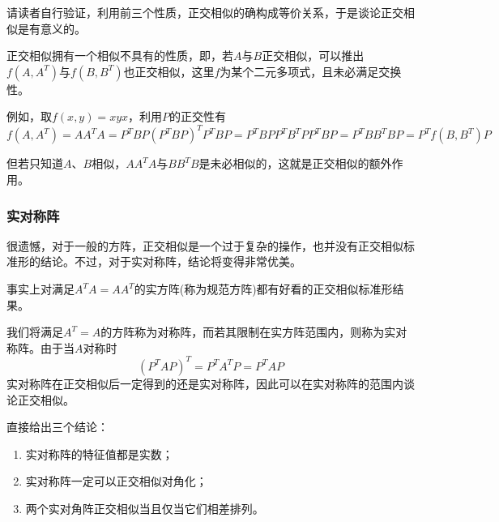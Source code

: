 \documentclass[a4paper,UTF8,fontset=windows]{ctexart}
\newcommand*{\note}{\noindent *}
\begin{document}
\note 请读者自行验证，利用前三个性质，正交相似的确构成等价关系，于是谈论正交相似是有意义的。

正交相似拥有一个相似不具有的性质，即，若$A$与$B$正交相似，可以推出$f(A,A^T)$与$f(B,B^T)$也正交相似，这里$f$为某个二元多项式，且未必满足交换性。

例如，取$f(x,y)=xyx$，利用$P$的正交性有
$$f(A,A^T)=AA^TA=P^TBP(P^TBP)^TP^TBP=P^TBPP^TB^TPP^TBP=P^TBB^TBP=P^Tf(B,B^T)P$$

但若只知道$A$、$B$相似，$AA^TA$与$BB^TB$是未必相似的，这就是正交相似的额外作用。

\subsubsection{实对称阵}
很遗憾，对于一般的方阵，正交相似是一个过于复杂的操作，也并没有正交相似标准形的结论。不过，对于实对称阵，结论将变得非常优美。

\note 事实上对满足$A^TA=AA^T$的实方阵(称为规范方阵)都有好看的正交相似标准形结果。

我们将满足$A^T=A$的方阵称为对称阵，而若其限制在实方阵范围内，则称为实对称阵。由于当$A$对称时
$$(P^TAP)^T=P^TA^TP=P^TAP$$
实对称阵在正交相似后一定得到的还是实对称阵，因此可以在实对称阵的范围内谈论正交相似。

直接给出三个结论：
\begin{enumerate}
    \item 实对称阵的特征值都是实数；
    \item 实对称阵一定可以正交相似对角化；
    \item 两个实对角阵正交相似当且仅当它们相差排列。
\end{enumerate}
\end{document}

